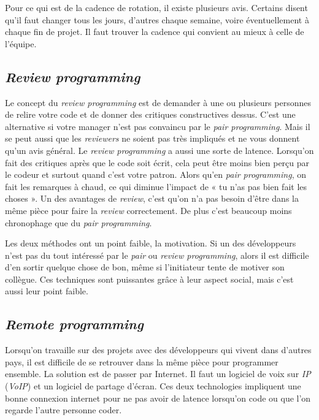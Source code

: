 \documentclass[journal, a4paper, frenchb]{IEEEtran}
\begin{document}
Pour ce qui est de la cadence de rotation, il existe plusieurs avis. Certains disent qu’il faut changer tous les jours, d’autres chaque semaine, voire éventuellement à chaque fin de projet. Il faut trouver la cadence qui convient au mieux à celle de l’équipe.

\subsection{\emph{Review programming}}

Le concept du \emph{review programming} est de demander à une ou plusieurs personnes de relire votre code et de donner des critiques constructives dessus. C’est une alternative si votre manager n’est pas convaincu par le \emph{pair programming}. Mais il se peut aussi que les \emph{reviewers} ne soient pas très impliqués et ne vous donnent qu’un avis général. Le \emph{review programming} a aussi une sorte de latence. Lorsqu’on fait des critiques après que le code soit écrit, cela peut être moins bien perçu par le codeur et surtout quand c’est votre patron. Alors qu’en \emph{pair programming}, on fait les remarques à chaud, ce qui diminue l’impact de « tu n’as pas bien fait les choses ». Un des avantages de \emph{review}, c’est qu’on n'a pas besoin d’être dans la même pièce pour faire la \emph{review} correctement. De plus c'est beaucoup moins chronophage que du \emph{pair programming}.

Les deux méthodes ont un point faible, la motivation. Si un des développeurs n’est pas du tout intéressé par le \emph{pair} ou \emph{review programming}, alors il est difficile d’en sortir quelque chose de bon, même si l’initiateur tente de motiver son collègue. Ces techniques sont puissantes grâce à leur aspect social, mais c’est aussi leur point faible.

\subsection{\emph{Remote programming}}

Lorsqu’on travaille sur des projets avec des développeurs qui vivent dans d’autres pays, il est difficile de se retrouver dans la même pièce pour programmer ensemble. La solution est de passer par Internet. Il faut un logiciel de voix sur \emph{IP} (\emph{VoIP}) et un logiciel de partage d’écran. Ces deux technologies impliquent une bonne connexion internet pour ne pas avoir de latence lorsqu’on code ou que l’on regarde l’autre personne coder.
\end{document}
